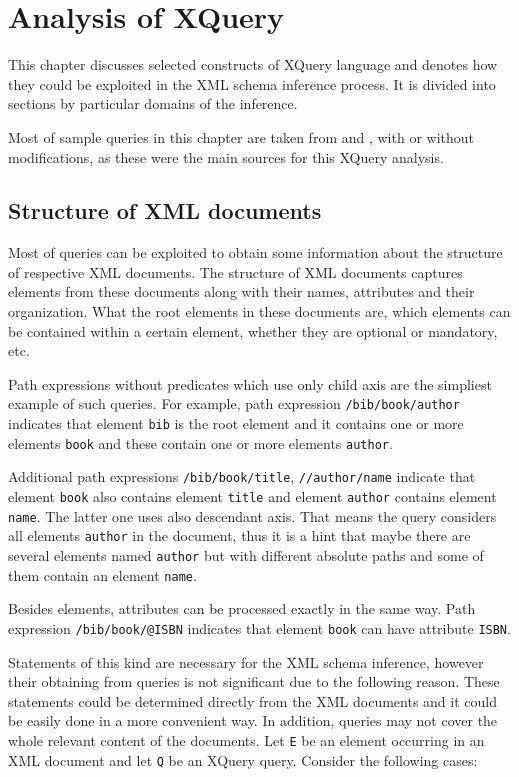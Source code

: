 \chapter{Analysis of XQuery} \label{CHAPTER_analysis_of_xquery}
This chapter discusses selected constructs of XQuery language and denotes how they could be exploited in the XML schema inference process. It is divided into sections by particular domains of the inference.

Most of sample queries in this chapter are taken from \cite{Walmsley:2007:XQU:1205865} and \cite{Marchiori:07:XQU}, with or without modifications, as these were the main sources for this XQuery analysis.

\section{Structure of XML documents}
Most of queries can be exploited to obtain some information about the structure of respective XML documents. The structure of XML documents captures elements from these documents along with their names, attributes and their organization. What the root elements in these documents are, which elements can be contained within a certain element, whether they are optional or mandatory, etc.

Path expressions without predicates which use only child axis are the simpliest example of such queries. For example, path expression \texttt{/bib/book/author} indicates that element \texttt{bib} is the root element and it contains one or more elements \texttt{book} and these contain one or more elements \texttt{author}.

Additional path expressions \texttt{/bib/book/title}, \texttt{//author/name} indicate that element \texttt{book} also contains element \texttt{title} and element \texttt{author} contains element \texttt{name}. The latter one uses also descendant axis. That means the query considers all elements \texttt{author} in the document, thus it is a hint that maybe there are several elements named \texttt{author} but with different absolute paths and some of them contain an element \texttt{name}.

Besides elements, attributes can be processed exactly in the same way. Path expression \texttt{/bib/book/@ISBN} indicates that element \texttt{book} can have attribute \texttt{ISBN}.

Statements of this kind are necessary for the XML schema inference, however their obtaining from queries is not significant due to the following reason. These statements could be determined directly from the XML documents and it could be easily done in a more convenient way. In addition, queries may not cover the whole relevant content of the documents. Let \texttt{E} be an element occurring in an XML document and let \texttt{Q} be an XQuery query. Consider the following cases:


